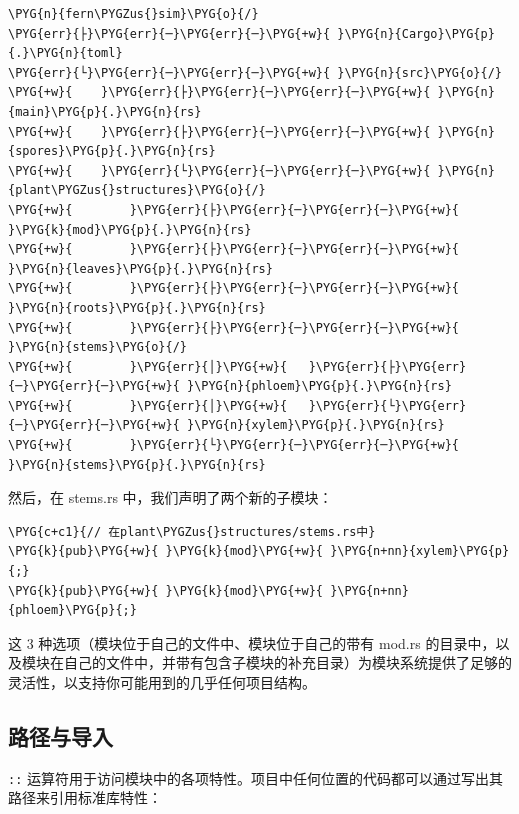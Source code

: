 \begin{Verbatim}[commandchars=\\\{\},breaklines=true,breakanywhere=true,fontsize=\codefont,xleftmargin=17bp]
\PYG{n}{fern\PYGZus{}sim}\PYG{o}{/}
\PYG{err}{├}\PYG{err}{─}\PYG{err}{─}\PYG{+w}{ }\PYG{n}{Cargo}\PYG{p}{.}\PYG{n}{toml}
\PYG{err}{└}\PYG{err}{─}\PYG{err}{─}\PYG{+w}{ }\PYG{n}{src}\PYG{o}{/}
\PYG{+w}{    }\PYG{err}{├}\PYG{err}{─}\PYG{err}{─}\PYG{+w}{ }\PYG{n}{main}\PYG{p}{.}\PYG{n}{rs}
\PYG{+w}{    }\PYG{err}{├}\PYG{err}{─}\PYG{err}{─}\PYG{+w}{ }\PYG{n}{spores}\PYG{p}{.}\PYG{n}{rs}
\PYG{+w}{    }\PYG{err}{└}\PYG{err}{─}\PYG{err}{─}\PYG{+w}{ }\PYG{n}{plant\PYGZus{}structures}\PYG{o}{/}
\PYG{+w}{        }\PYG{err}{├}\PYG{err}{─}\PYG{err}{─}\PYG{+w}{ }\PYG{k}{mod}\PYG{p}{.}\PYG{n}{rs}
\PYG{+w}{        }\PYG{err}{├}\PYG{err}{─}\PYG{err}{─}\PYG{+w}{ }\PYG{n}{leaves}\PYG{p}{.}\PYG{n}{rs}
\PYG{+w}{        }\PYG{err}{├}\PYG{err}{─}\PYG{err}{─}\PYG{+w}{ }\PYG{n}{roots}\PYG{p}{.}\PYG{n}{rs}
\PYG{+w}{        }\PYG{err}{├}\PYG{err}{─}\PYG{err}{─}\PYG{+w}{ }\PYG{n}{stems}\PYG{o}{/}
\PYG{+w}{        }\PYG{err}{│}\PYG{+w}{   }\PYG{err}{├}\PYG{err}{─}\PYG{err}{─}\PYG{+w}{ }\PYG{n}{phloem}\PYG{p}{.}\PYG{n}{rs}
\PYG{+w}{        }\PYG{err}{│}\PYG{+w}{   }\PYG{err}{└}\PYG{err}{─}\PYG{err}{─}\PYG{+w}{ }\PYG{n}{xylem}\PYG{p}{.}\PYG{n}{rs}
\PYG{+w}{        }\PYG{err}{└}\PYG{err}{─}\PYG{err}{─}\PYG{+w}{ }\PYG{n}{stems}\PYG{p}{.}\PYG{n}{rs}
\end{Verbatim}

然后，在 stems.rs 中，我们声明了两个新的子模块：

\begin{Verbatim}[commandchars=\\\{\},breaklines=true,breakanywhere=true,fontsize=\codefont,xleftmargin=17bp]
\PYG{c+c1}{// 在plant\PYGZus{}structures/stems.rs中}
\PYG{k}{pub}\PYG{+w}{ }\PYG{k}{mod}\PYG{+w}{ }\PYG{n+nn}{xylem}\PYG{p}{;}
\PYG{k}{pub}\PYG{+w}{ }\PYG{k}{mod}\PYG{+w}{ }\PYG{n+nn}{phloem}\PYG{p}{;}
\end{Verbatim}

这 3 种选项（模块位于自己的文件中、模块位于自己的带有 mod.rs 的目录中，以及模块在自己的文件中，并带有包含子模块的补充目录）为模块系统提供了足够的灵活性，以支持你可能用到的几乎任何项目结构。

\subsection{路径与导入}

\texttt{::} 运算符用于访问模块中的各项特性。项目中任何位置的代码都可以通过写出其路径来引用标准库特性：

